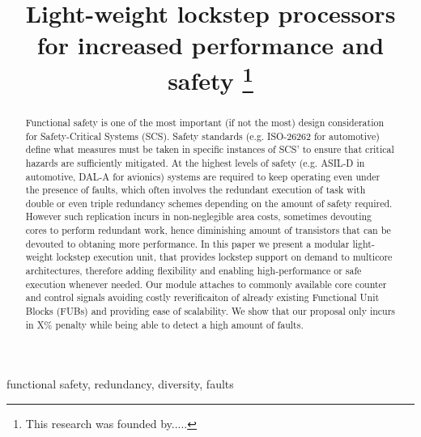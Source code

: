 \documentclass[conference]{IEEEtran}
\begin{document}
\title{Light-weight lockstep processors for increased performance and safety
\thanks{\color{red}This research was founded by.....}
}

\author{
}

\maketitle

\begin{abstract}
Functional safety is one of the most important (if not the most) design consideration for Safety-Critical Systems (SCS).
Safety standards (e.g. ISO-26262 for automotive) define what measures must be taken in specific instances of SCS' to ensure that critical hazards
are sufficiently mitigated. At the highest levels of safety (e.g. ASIL-D in automotive, DAL-A for avionics) systems are required
to keep operating even under the presence of faults, which often involves the redundant execution of task with double or even triple redundancy schemes
depending on the amount of safety required.
However such replication incurs in non-neglegible area costs, sometimes devouting cores to perform redundant work,
hence diminishing amount of transistors that can be devouted to obtaning more performance.
In this paper we present a modular light-weight lockstep execution unit, that provides lockstep support
on demand to multicore architectures, therefore adding flexibility and enabling high-performance or safe
execution whenever needed. Our module attaches to commonly available core counter and control signals
avoiding costly reverificaiton of already existing Functional Unit Blocks (FUBs) and providing ease of
scalability. We show that our proposal only incurs in X\% penalty while being able to detect a high amount of faults.
\end{abstract}

\begin{IEEEkeywords}
functional safety, redundancy, diversity, faults
\end{IEEEkeywords}









\end{document}
